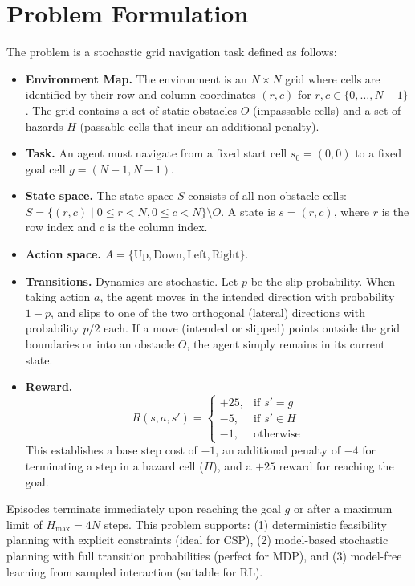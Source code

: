 \documentclass[letterpaper]{article} %
\begin{document}
\section{Problem Formulation}
The problem is a stochastic grid navigation task defined as follows:
\begin{itemize}
    \item \textbf{Environment Map.} The environment is an $N \times N$ grid where cells are identified by their row and column coordinates $(r,c)$ for $r, c \in \{0, \dots, N-1\}$. The grid contains a set of static obstacles $O$ (impassable cells) and a set of hazards $H$ (passable cells that incur an additional penalty).
    \item \textbf{Task.} An agent must navigate from a fixed start cell $s_0=(0,0)$ to a fixed goal cell $g=(N-1,N-1)$.
    \item \textbf{State space.} The state space $S$ consists of all non-obstacle cells: $S = \{(r,c) \mid 0 \le r < N, 0 \le c < N \} \setminus O$. A state is $s=(r,c)$, where $r$ is the row index and $c$ is the column index.
    \item \textbf{Action space.} $A=\{\text{Up},\text{Down},\text{Left},\text{Right}\}$.
    \item \textbf{Transitions.} Dynamics are stochastic. Let $p$ be the slip probability. When taking action $a$, the agent moves in the intended direction with probability $1-p$, and slips to one of the two orthogonal (lateral) directions with probability $p/2$ each. If a move (intended or slipped) points outside the grid boundaries or into an obstacle $O$, the agent simply remains in its current state.
    \item \textbf{Reward.}
\begin{equation}
R(s,a,s')=
\begin{cases}
+25, & \text{if } s'=g\\
-5, & \text{if } s'\in H\\
-1, & \text{otherwise}
\end{cases}
\end{equation}
This establishes a base step cost of $-1$, an additional penalty of $-4$ for terminating a step in a hazard cell ($H$), and a $+25$ reward for reaching the goal.
\end{itemize}
Episodes terminate immediately upon reaching the goal $g$ or after a maximum limit of $H_{\max}=4N$ steps. This problem supports: (1) deterministic feasibility planning with explicit constraints (ideal for CSP), (2) model-based stochastic planning with full transition probabilities (perfect for MDP), and (3) model-free learning from sampled interaction (suitable for RL).
\end{document}
